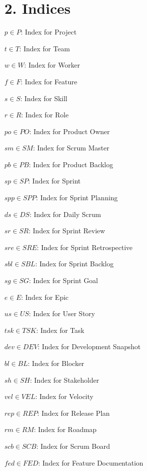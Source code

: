 \documentclass[12pt]{article}
\begin{document}
\section{2. Indices}
\item $ p \in P $: Index for Project
    \item $ t \in T $: Index for Team
    \item $ w \in W $: Index for Worker
    \item $ f \in F $: Index for Feature
    \item $ s \in S $: Index for Skill
    \item $ r \in R $: Index for Role
    \item $ po \in PO $: Index for Product Owner
    \item $ sm \in SM $: Index for Scrum Master
    \item $ pb \in PB $: Index for Product Backlog
    \item $ sp \in SP $: Index for Sprint
    \item $ spp \in SPP $: Index for Sprint Planning
    \item $ ds \in DS $: Index for Daily Scrum
    \item $ sr \in SR $: Index for Sprint Review
    \item $ sre \in SRE $: Index for Sprint Retrospective
    \item $ sbl \in SBL $: Index for Sprint Backlog
    \item $ sg \in SG $: Index for Sprint Goal
    \item $ e \in E $: Index for Epic
    \item $ us \in US $: Index for User Story
    \item $ tsk \in TSK $: Index for Task
    \item $ dev \in DEV $: Index for Development Snapshot
    \item $ bl \in BL $: Index for Blocker
    \item $ sh \in SH $: Index for Stakeholder
    \item $ vel \in VEL $: Index for Velocity
    \item $ rep \in REP $: Index for Release Plan
    \item $ rm \in RM $: Index for Roadmap
    \item $ scb \in SCB $: Index for Scrum Board
    \item $ fed \in FED $: Index for Feature Documentation
\end{document}

